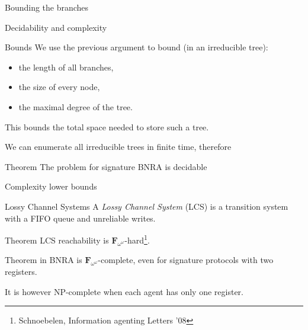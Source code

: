 \documentclass{beamer}
\begin{document}
\begin{frame}{Bounding the branches}
	\centering
	

\end{frame}


\begin{frame}{Decidability and complexity}
	\begin{block}{Bounds}
	We use the previous argument to bound (in an irreducible tree):
	\begin{itemize}
	\item the length of all branches,
	\item the size of every node,
	\item the maximal degree of the tree.
	\end{itemize}
	This bounds the total space needed to store such a tree.
	\end{block}
	\pause 

	We can enumerate all irreducible trees in finite time, therefore
	
	\begin{block}{Theorem}
		The {} problem for \color{blue}signature \color{black} BNRA is decidable \onslide<3->{\color{red!70!black} and in $\mathbf{F}_{\omega^\omega}$.}
	\end{block} 
\end{frame}

\begin{frame}{Complexity lower bounds}
	\begin{block}{Lossy Channel Systems}
	A \emph{Lossy Channel System} (LCS) is a transition system with a FIFO queue and unreliable writes.
	\end{block}

	\begin{block}{Theorem}
	LCS reachability is $\mathbf{F}_{\omega^\omega}$-hard\footnote{Schnoebelen, Information agenting Letters '08}.
	\end{block}

	\pause 

	\begin{block}{Theorem}
	{} in BNRA is $\mathbf{F}_{\omega^\omega}$-complete, even for signature protocols with two registers.
	\end{block}

	\pause
	It is however NP-complete when each agent has only one register.
\end{frame}
\end{document}
